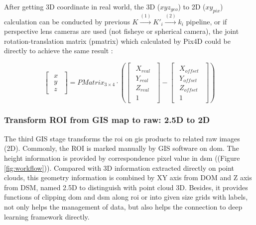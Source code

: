 \documentclass{configs/bmcart}
\begin{document}
After getting 3D coordinate in real world, the 3D ($xyz_{geo}$) to 2D ($xy_{pix}$) calculation can be conducted by previous $K \xrightarrow{(1)} K'_i \xrightarrow{(2)} k_i$ pipeline, or if perspective lens cameras are used (not fisheye or spherical camera), the joint rotation-translation matrix (pmatrix) which calculated by Pix4D could be directly to achieve the same result \cite{pix4d_support_what_2020}:

$$
\begin{bmatrix}\begin{matrix} x \\ y \\ z\end{matrix}\end{bmatrix}
= PMatrix_{3\times4} \cdot 
\left(\begin{bmatrix}\begin{matrix} 
  X_{real} \\ Y_{real} \\ Z_{real} \\ 1
\end{matrix}\end{bmatrix} 
- 
\begin{bmatrix}\begin{matrix} 
  X_{offset} \\ Y_{offset} \\ Z_{offset} \\ 1
\end{matrix}\end{bmatrix}
\right)
$$

\subsubsection*{Transform ROI from GIS map to raw: 2.5D to 2D}
The third GIS stage transforms the \acrshort*{roi} on \acrshort*{gis} products to related raw images (2D). Commonly, the ROI is marked manually by GIS software on \acrshort*{dom}. The height information is provided by correspondence pixel value in \acrshort*{dsm} ((Figure \ref{fig:workflow})). Compared with 3D information extracted directly on point clouds, this geometry information is combined by XY axis from DOM and Z axis from DSM, named 2.5D to distinguish with point cloud 3D. Besides, it provides functions of clipping \acrshort*{dom} and \acrshort*{dsm} along \acrshort*{roi} or into given size grids with labels, not only helps the management of data, but also helps the connection to deep learning framework directly.
\end{document}
